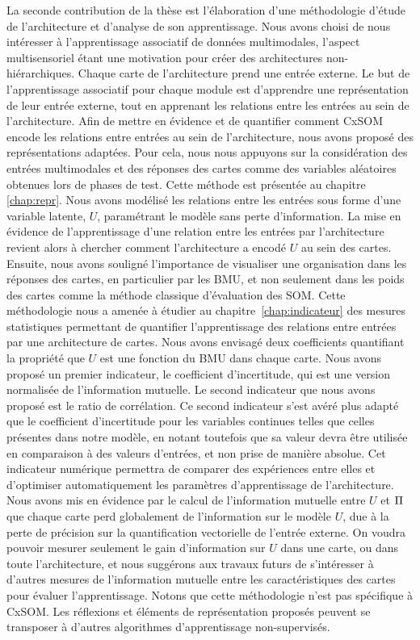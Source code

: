 La seconde contribution de la thèse est l'élaboration d'une méthodologie d'étude de l'architecture et d'analyse de son apprentissage. 
Nous avons choisi de nous intéresser à l'apprentissage associatif de données multimodales, l'aspect multisensoriel étant une motivation pour créer des architectures non-hiérarchiques. 
Chaque carte de l'architecture prend une entrée externe. 
Le but de l'apprentissage associatif pour chaque module est d'apprendre une représentation de leur entrée externe, tout en apprenant les relations entre les entrées au sein de l'architecture.
Afin de mettre en évidence et de quantifier comment CxSOM encode les relations entre entrées au sein de l'architecture, nous avons proposé des représentations adaptées. Pour cela, nous nous appuyons sur la considération des entrées multimodales et des réponses des cartes comme des variables aléatoires obtenues lors de phases de test. Cette méthode est présentée au chapitre \ref{chap:repr}.
Nous avons modélisé les relations entre les entrées sous forme d'une variable latente, $U$, paramétrant le modèle sans perte d'information. La mise en évidence de l'apprentissage d'une relation entre les entrées par l'architecture revient alors à chercher comment l'architecture a encodé $U$ au sein des cartes.
Ensuite, nous avons souligné l'importance de visualiser une organisation dans les réponses des cartes, en particulier par les BMU, et non seulement dans les poids des cartes comme la méthode classique d'évaluation des SOM.
Cette méthodologie nous a amenée à étudier au chapitre~\ref{chap:indicateur} des mesures statistiques permettant de quantifier l'apprentissage des relations entre entrées par une architecture de cartes.
Nous avons envisagé deux coefficients quantifiant la propriété que $U$ est une fonction du BMU dans chaque carte.
Nous avons proposé un premier indicateur, le coefficient d'incertitude, qui est une version normalisée de l'information mutuelle.
Le second indicateur que nous avons proposé est le ratio de corrélation. 
Ce second indicateur s'est avéré plus adapté que le coefficient d'incertitude pour les variables continues telles que celles présentes dans notre modèle, en notant toutefois que sa valeur devra être utilisée en comparaison à des valeurs d'entrées, et non prise de manière absolue. 
Cet indicateur numérique permettra de comparer des expériences entre elles et d'optimiser automatiquement les paramètres d'apprentissage de l'architecture.
Nous avons mis en évidence par le calcul de l'information mutuelle entre $U$ et $\Pi$ que chaque carte perd  globalement de l'information sur le modèle $U$, due à la perte de précision sur la quantification vectorielle de l'entrée externe. On voudra pouvoir mesurer seulement le gain d'information sur $U$ dans une carte, ou dans toute l'architecture, et nous suggérons aux travaux futurs de s'intéresser à d'autres mesures de l'information mutuelle entre les caractéristiques des cartes pour évaluer l'apprentissage.
Notons que cette méthodologie n'est pas spécifique à CxSOM. Les réflexions et éléments de représentation proposés peuvent se transposer à d'autres algorithmes d'apprentissage non-supervisés.


